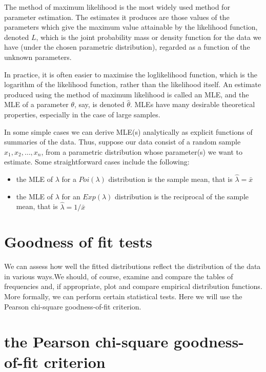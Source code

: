 \documentclass[
]{book}
\theoremstyle{definition}
\theoremstyle{definition}
\theoremstyle{definition}
\theoremstyle{definition}
\theoremstyle{remark}
\begin{document}
The method of maximum likelihood is the most widely used method for
parameter estimation. The estimates it produces are those values of the
parameters which give the maximum value attainable by the likelihood
function, denoted \(L\), which is the joint probability mass or density
function for the data we have (under the chosen parametric
distribution), regarded as a function of the unknown parameters.

In practice, it is often easier to maximise the loglikelihood function,
which is the logarithm of the likelihood function, rather than the
likelihood itself. An estimate produced using the method of maximum
likelihood is called an MLE, and the MLE of a parameter \(\theta\), say,
is denoted \(\hat{\theta}\). MLEs have many desirable theoretical
properties, especially in the case of large samples.

In some simple cases we can derive MLE(s) analytically as explicit
functions of summaries of the data. Thus, suppose our data consist of a
random sample \(x_1, x_2, \ldots , x_n\), from a parametric distribution
whose parameter(s) we want to estimate. Some straightforward cases
include the following:

\begin{itemize}
\item
  the MLE of \(\lambda\) for a \(Poi(\lambda)\) distribution is the sample
  mean, that is \(\hat{\lambda} = \bar{x}\)
\item
  the MLE of \(\lambda\) for an \(Exp(\lambda)\) distribution is the
  reciprocal of the sample mean, that is \(\hat{\lambda} = 1/\bar{x}\)
\end{itemize}

\hypertarget{goodness-of-fit-tests}{%
\section{Goodness of fit tests}\label{goodness-of-fit-tests}}

We can assess how well the fitted distributions reflect the distribution
of the data in various ways.We should, of course, examine and compare
the tables of frequencies and, if appropriate, plot and compare
empirical distribution functions. More formally, we can perform certain
statistical tests. Here we will use the Pearson chi-square
goodness-of-fit criterion.

\hypertarget{the-pearson-chi-square-goodness-of-fit-criterion}{%
\section{the Pearson chi-square goodness-of-fit criterion}\label{the-pearson-chi-square-goodness-of-fit-criterion}}
\end{document}
